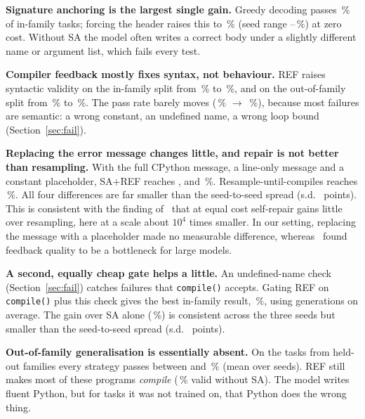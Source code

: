 \textbf{Signature anchoring is the largest single gain.} Greedy decoding passes \testidgreedypass\,\% of in-family tasks; forcing the header raises this to \testidanchorpass\,\% (seed range \testidanchorpassmin--\testidanchorpassmax\,\%) at zero cost. Without SA the model often writes a correct body under a slightly different name or argument list, which fails every test.

\textbf{Compiler feedback mostly fixes syntax, not behaviour.} REF raises syntactic validity on the in-family split from \testidanchorvalid\,\% to \testidarefvalid\,\%, and on the out-of-family split from \testoodanchorvalid\,\% to \testoodarefvalid\,\%. The pass rate barely moves (\testidanchorpass\,\% $\rightarrow$ \testidarefpass\,\%), because most failures are semantic: a wrong constant, an undefined name, a wrong loop bound (Section~\ref{sec:fail}).

\textbf{Replacing the error message changes little, and repair is not better than resampling.} With the full CPython message, a line-only message and a constant placeholder, SA+REF reaches \testidarefpass, \testidareflinepass{} and \testidarefnoerrpass\,\%. Resample-until-compiles reaches \testidaresamplepass\,\%. All four differences are far smaller than the seed-to-seed spread (s.d.\ \testidarefpasssd{} points). This is consistent with the finding of~\cite{olausson2024selfrepair} that at equal cost self-repair gains little over resampling, here at a scale about $10^{4}$ times smaller. In our setting, replacing the message with a placeholder made no measurable difference, whereas~\cite{olausson2024selfrepair} found feedback quality to be a bottleneck for large models.

\textbf{A second, equally cheap gate helps a little.} An undefined-name check (Section~\ref{sec:fail}) catches failures that \texttt{compile()} accepts. Gating REF on \texttt{compile()} plus this check gives the best in-family result, \testidareflintpass\,\%, using \testidareflintgens{} generations on average. The gain over SA alone (\testidanchorpass\,\%) is consistent across the three seeds but smaller than the seed-to-seed spread (s.d.\ \testidareflintpasssd{} points).

\textbf{Out-of-family generalisation is essentially absent.} On the \ntestood{} tasks from held-out families every strategy passes between \testoodgreedypass{} and \testoodaresamplelintpass\,\% (mean over seeds). REF still makes most of these programs \emph{compile} (\testoodrefvalid\,\% valid without SA). The model writes fluent Python, but for tasks it was not trained on, that Python does the wrong thing.

